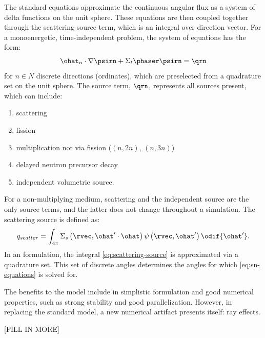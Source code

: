 The standard \Sn equations approximate the continuous angular flux as a system of delta functions on the unit sphere.
These equations are then coupled together through the scattering source term, which is an integral over direction vector.
For a monoenergetic, time-independent problem, the system of equations has the form:
\begin{equation}
  \label{eq:sn-equations}
  \ohat_n\cdot\nabla\psirn+\Sigma_t\phaser\psirn=\qrn
\end{equation}
for $n\in N$ discrete directions (ordinates), which are preselected from a quadrature set on the unit sphere.
The source term, $\qrn$, represents all sources present, which can include:
\begin{enumerate}
  \item scattering
  \item fission
  \item multiplication not via fission ($(n,2n)$, $(n,3n)$)
  \item delayed neutron precursor decay
  \item independent volumetric source.
\end{enumerate}
For a non-multiplying medium, scattering and the independent source are the only source terms, and the latter does not change throughout a simulation.
The scattering source is defined as:
\begin{equation}
  \label{eq:scattering-source}
  q_{scatter}=\int_{4\pi}\Sigma_s\left(\rvec,\ohat'\cdot \ohat\right)\psi\left(\rvec,\ohat'\right)\odif{\ohat'}.
\end{equation}
In an \Sn formulation, the integral \cref{eq:scattering-source} is approximated via a quadrature set.
This set of discrete angles determines the angles for which \cref{eq:sn-equations} is solved for.

The benefits to the \Sn model include in simplistic formulation and good numerical properties, such as strong stability and good parallelization.
However, in replacing the standard model, a new numerical artifact presents itself: ray effects.

  [FILL IN MORE]


